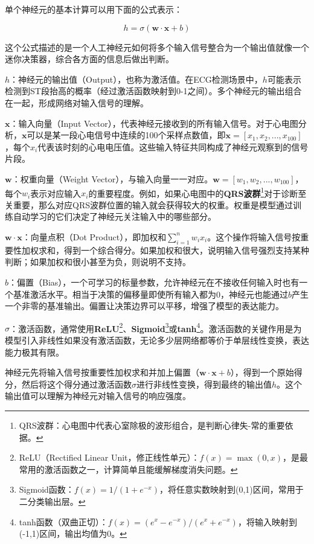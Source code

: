 单个神经元的基本计算可以用下面的公式表示：

\[
h = \sigma(\mathbf{w} \cdot \mathbf{x} + b)
\]

这个公式描述的是一个人工神经元如何将多个输入信号整合为一个输出值就像一个迷你决策器，综合各方面的信息后做出判断。



$h$：神经元的输出值（Output），也称为激活值。在ECG检测场景中，$h$可能表示检测到ST段抬高的概率（经过激活函数映射到0-1之间）。多个神经元的输出组合在一起，形成网络对输入信号的理解。

$\mathbf{x}$：输入向量（Input Vector），代表神经元接收到的所有输入信号。对于心电图分析，$\mathbf{x}$可以是某一段心电信号中连续的100个采样点数值，即$\mathbf{x} = [x_1, x_2, ..., x_{100}]$，每个$x_i$代表该时刻的心电电压值。这些输入特征共同构成了神经元观察到的信号片段。

$\mathbf{w}$：权重向量（Weight Vector），与输入向量一一对应。$\mathbf{w} = [w_1, w_2, ..., w_{100}]$，每个$w_i$表示对应输入$x_i$的重要程度。例如，如果心电图中的\textbf{QRS波群}\footnote{QRS波群：心电图中代表心室除极的波形组合，是判断心律失-常的重要依据。}对于诊断至关重要，那么对应QRS波群位置的输入就会获得较大的权重。权重是模型通过训练自动学习的它们决定了神经元关注输入中的哪些部分。

$\mathbf{w} \cdot \mathbf{x}$：向量点积（Dot Product），即加权和$\sum_{i=1}^{n} w_i x_i$。这个操作将输入信号按重要性加权求和，得到一个综合得分。如果加权和很大，说明输入信号强烈支持某种判断；如果加权和很小甚至为负，则说明不支持。

$b$：偏置（Bias），一个可学习的标量参数，允许神经元在不接收任何输入时也有一个基准激活水平。相当于决策的偏移量即使所有输入都为0，神经元也能通过$b$产生一个非零的基准输出。偏置让决策边界可以平移，增强了模型的表达能力。

$\sigma$：激活函数，通常使用\textbf{ReLU}\footnote{ReLU（Rectified Linear Unit，修正线性单元）：$f(x)=\max(0,x)$，是最常用的激活函数之一，计算简单且能缓解梯度消失问题。}、\textbf{Sigmoid}\footnote{Sigmoid函数：$f(x)=1/(1+e^{-x})$，将任意实数映射到(0,1)区间，常用于二分类输出层。}或\textbf{tanh}\footnote{tanh函数（双曲正切）：$f(x)=(e^x-e^{-x})/(e^x+e^{-x})$，将输入映射到(-1,1)区间，输出均值为0。}。激活函数的关键作用是为模型引入非线性如果没有激活函数，无论多少层网络都等价于单层线性变换，表达能力极其有限。

神经元先将输入信号按重要性加权求和并加上偏置（$\mathbf{w} \cdot \mathbf{x} + b$），得到一个原始得分，然后将这个得分通过激活函数$\sigma$进行非线性变换，得到最终的输出值$h$。这个输出值可以理解为神经元对输入信号的响应强度。

